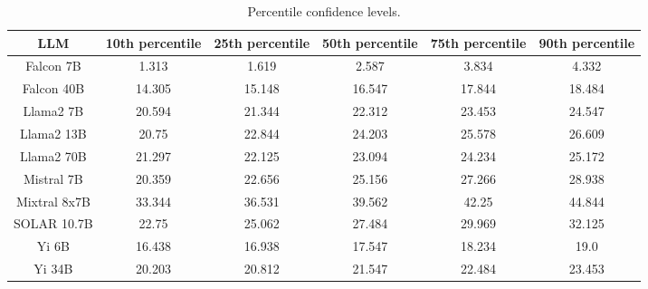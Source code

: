 \begin{table*}
\centering
\begin{tabular}{c|c|c|c|c|c}
LLM & 10th percentile & 25th percentile & 50th percentile & 75th percentile & 90th percentile\\ \hline
Falcon 7B & 1.313 & 1.619 & 2.587 & 3.834 & 4.332\\
Falcon 40B & 14.305 & 15.148 & 16.547 & 17.844 & 18.484\\
Llama2 7B & 20.594 & 21.344 & 22.312 & 23.453 & 24.547\\
Llama2 13B & 20.75 & 22.844 & 24.203 & 25.578 & 26.609\\
Llama2 70B & 21.297 & 22.125 & 23.094 & 24.234 & 25.172\\
Mistral 7B & 20.359 & 22.656 & 25.156 & 27.266 & 28.938\\
Mixtral 8x7B & 33.344 & 36.531 & 39.562 & 42.25 & 44.844\\
SOLAR 10.7B & 22.75 & 25.062 & 27.484 & 29.969 & 32.125\\
Yi 6B & 16.438 & 16.938 & 17.547 & 18.234 & 19.0\\
Yi 34B & 20.203 & 20.812 & 21.547 & 22.484 & 23.453\\
\hline
\end{tabular}
\caption{Percentile confidence levels.}
\label{tab:percentile_conf}
\end{table*}
